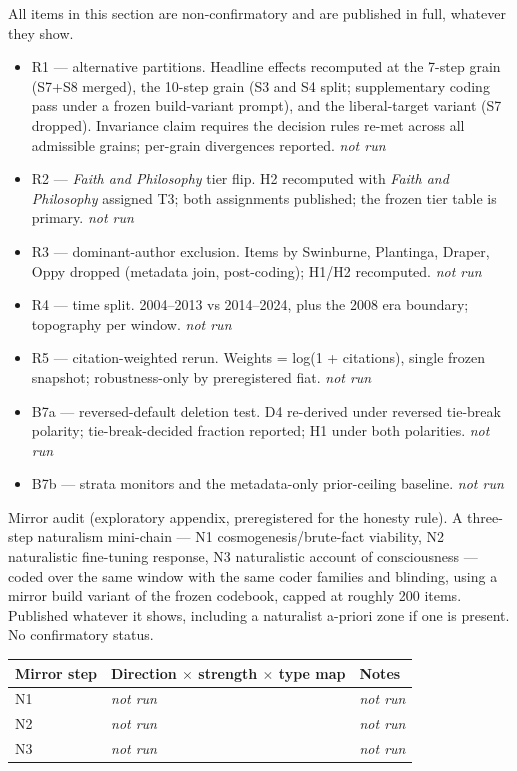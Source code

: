 All items in this section are non-confirmatory and are published in full, whatever they show.

\begin{itemize}
\tightlist
\item
  R1 --- alternative partitions. Headline effects recomputed at the 7-step grain (S7+S8 merged), the 10-step grain (S3 and S4 split; supplementary coding pass under a frozen build-variant prompt), and the liberal-target variant (S7 dropped). Invariance claim requires the decision rules re-met across all admissible grains; per-grain divergences reported. \emph{not run}
\item
  R2 --- \emph{Faith and Philosophy} tier flip. H2 recomputed with \emph{Faith and Philosophy} assigned T3; both assignments published; the frozen tier table is primary. \emph{not run}
\item
  R3 --- dominant-author exclusion. Items by Swinburne, Plantinga, Draper, Oppy dropped (metadata join, post-coding); H1/H2 recomputed. \emph{not run}
\item
  R4 --- time split. 2004--2013 vs 2014--2024, plus the 2008 era boundary; topography per window. \emph{not run}
\item
  R5 --- citation-weighted rerun. Weights = log(1 + citations), single frozen snapshot; robustness-only by preregistered fiat. \emph{not run}
\item
  B7a --- reversed-default deletion test. D4 re-derived under reversed tie-break polarity; tie-break-decided fraction reported; H1 under both polarities. \emph{not run}
\item
  B7b --- strata monitors and the metadata-only prior-ceiling baseline. \emph{not run}
\end{itemize}

Mirror audit (exploratory appendix, preregistered for the honesty rule). A three-step naturalism mini-chain --- N1 cosmogenesis/brute-fact viability, N2 naturalistic fine-tuning response, N3 naturalistic account of consciousness --- coded over the same window with the same coder families and blinding, using a mirror build variant of the frozen codebook, capped at roughly 200 items. Published whatever it shows, including a naturalist a-priori zone if one is present. No confirmatory status.

\begin{longtable}[]{@{}lll@{}}
\toprule\noalign{}
Mirror step & Direction $\times$ strength $\times$ type map & Notes \\
\midrule\noalign{}
\endhead
\bottomrule\noalign{}
\endlastfoot
N1 & \emph{not run} & \emph{not run} \\
N2 & \emph{not run} & \emph{not run} \\
N3 & \emph{not run} & \emph{not run} \\
\end{longtable}

